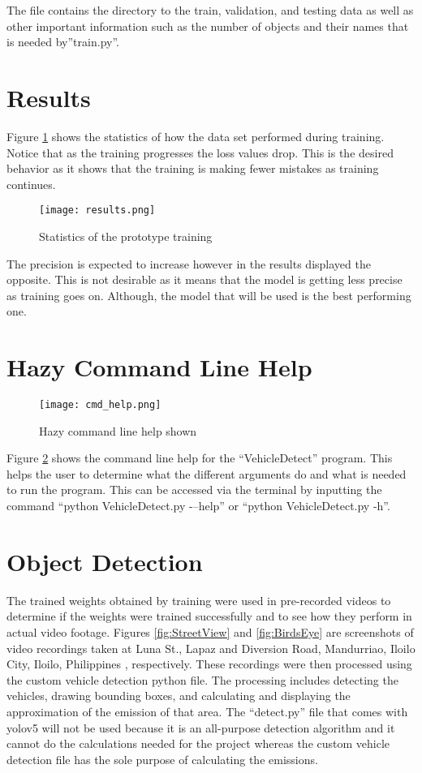 The file contains the directory to the train, validation, and testing data as well as other important information such as the number of objects and their names that is needed by”train.py”. 

\section{Results}

Figure \ref{fig:res} shows the statistics of how the data set performed during training.
Notice that as the training progresses the loss values drop. This is the desired behavior as it shows that the training is making fewer mistakes as training continues.


\begin{figure}[h!]
	\texttt{[image: results.png]}
	\caption{Statistics of the prototype training}
	\label{fig:res}
\end{figure}

\newpage
The precision is expected to increase however in the results displayed the opposite. This is not desirable as it means that the model is getting less precise as training goes on. Although, the model that will be used is the best performing one.

\newpage
\section{Hazy Command Line Help}

\begin{figure}[h!]
	\texttt{[image: cmd\_help.png]}
	\caption{Hazy command line help shown}
	\label{fig:cmdhelp}
\end{figure}




Figure \ref{fig:cmdhelp} shows the command line help for the “VehicleDetect” program. This helps the user to determine what the different arguments do and what is needed to run the program. This can be accessed via the terminal by inputting the command “python VehicleDetect.py -–help” or “python VehicleDetect.py -h”.

\section{Object Detection}

The trained weights obtained by training were used in pre-recorded videos to determine if the weights were trained successfully and to see how they perform in actual video footage.  Figures \ref{fig:StreetView} and \ref{fig:BirdsEye} are screenshots of video recordings taken at Luna St., Lapaz and Diversion Road, Mandurriao, Iloilo City, Iloilo, Philippines , respectively. These recordings were then processed using the custom vehicle detection python file. The processing includes detecting the vehicles, drawing bounding boxes, and calculating and displaying the approximation of the emission of that area. The “detect.py” file that comes with yolov5 will not be used because it is an all-purpose detection algorithm and it cannot do the calculations needed for the project whereas the custom vehicle detection file has the sole purpose of calculating the emissions.

